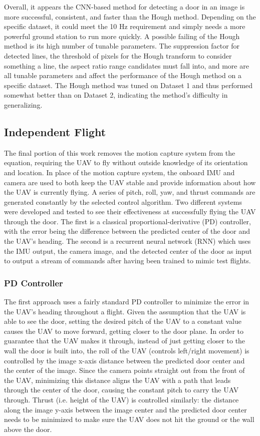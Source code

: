 \documentclass[12pt]{article}
\begin{document}
Overall, it appears the CNN-based method for detecting a door in an image is more successful, consistent, and faster than the Hough method. Depending on the specific dataset, it could meet the 10 Hz requirement and simply needs a more powerful ground station to run more quickly. A possible failing of the Hough method is its high number of tunable parameters. The suppression factor for detected lines, the threshold of pixels for the Hough transform to consider something a line, the aspect ratio range candidates must fall into, and more are all tunable parameters and affect the performance of the Hough method on a specific dataset. The Hough method was tuned on Dataset 1 and thus performed somewhat better than on Dataset 2, indicating the method's difficulty in generalizing.

\subsection{Independent Flight}
The final portion of this work removes the motion capture system from the equation, requiring the UAV to fly without outside knowledge of its orientation and location. In place of the motion capture system, the onboard IMU and camera are used to both keep the UAV stable and provide information about how the UAV is currently flying. A series of pitch, roll, yaw, and thrust commands are generated constantly by the selected control algorithm. Two different systems were developed and tested to see their effectiveness at successfully flying the UAV through the door. The first is a classical proportional-derivative (PD) controller, with the error being the difference between the predicted center of the door and the UAV's heading. The second is a recurrent neural network (RNN) which uses the IMU output, the camera image, and the detected center of the door as input to output a stream of commands after having been trained to mimic test flights. 

\subsubsection{PD Controller}
The first approach uses a fairly standard PD controller to minimize the error in the UAV's heading throughout a flight. Given the assumption that the UAV is able to see the door, setting the desired pitch of the UAV to a constant value causes the UAV to move forward, getting closer to the door plane. In order to guarantee that the UAV makes it through, instead of just getting closer to the wall the door is built into, the roll of the UAV (controls left/right movement) is controlled by the image x-axis distance between the predicted door center and the center of the image. Since the camera points straight out from the front of the UAV, minimizing this distance aligns the UAV with a path that leads through the center of the door, causing the constant pitch to carry the UAV through. Thrust (i.e. height of the UAV) is controlled similarly: the distance along the image y-axis between the image center and the predicted door center needs to be minimized to make sure the UAV does not hit the ground or the wall above the door.
\end{document}
